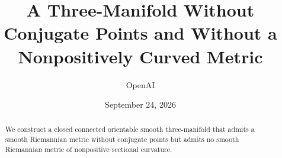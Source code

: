 \documentclass[11pt]{article}
\title{A Three-Manifold Without Conjugate Points and Without a Nonpositively Curved Metric}
\author{OpenAI}
\date{September 24, 2026}
\theoremstyle{remark}
\numberwithin{equation}{section}
\begin{document}
\maketitle
\begin{abstract}
We construct a closed connected orientable smooth three-manifold that admits a smooth Riemannian metric without conjugate points but admits no smooth Riemannian metric of nonpositive sectional curvature.
\end{abstract}
\tableofcontents






\appendix

\clearpage


\end{document}
